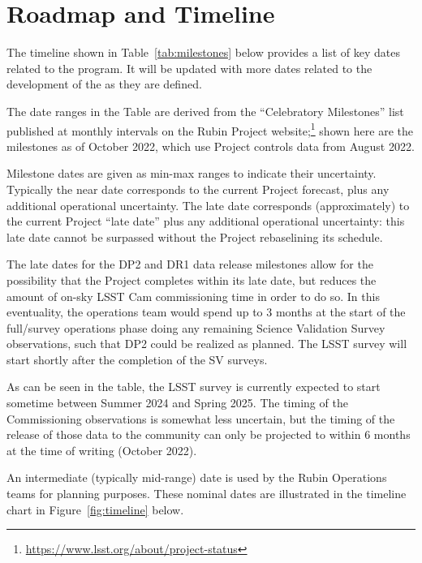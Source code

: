 \section{Roadmap and Timeline} \label{sec:timeline}

The timeline shown in Table~\ref{tab:milestones} below provides a list of key dates related to the \es program.
It will be updated with more dates related to the development of the \esp as they are defined.

The date ranges in the Table are derived from the ``Celebratory Milestones'' list published at monthly intervals on the Rubin Project website;\footnote{\url{https://www.lsst.org/about/project-status}} shown here are the milestones as of October 2022, which use Project controls data from August 2022.

Milestone dates are given as min-max ranges to indicate their uncertainty.
Typically the near date corresponds to the current Project forecast, plus any additional operational uncertainty.
The late date corresponds (approximately) to the current Project ``late date'' plus any additional operational uncertainty: this late date cannot be surpassed without the Project rebaselining its schedule.

The late dates for the DP2 and DR1 data release milestones allow for the possibility that the Project completes within its late date, but reduces the amount of on-sky LSST Cam commissioning time in order to do so.
In this eventuality, the operations team would spend up to 3 months at the start of the full/survey operations phase doing any remaining Science Validation Survey observations, such that DP2 could be realized as planned.
The LSST survey will start shortly after the completion of the SV surveys.

As can be seen in the table, the LSST survey is currently expected to start sometime between Summer 2024 and Spring 2025.
The timing of the Commissioning observations is somewhat less uncertain, but the timing of the release of those data to the community can only be projected to within 6 months at the time of writing (October 2022).

An intermediate (typically mid-range) date is used by the Rubin Operations teams for planning purposes. These nominal dates are illustrated in the timeline chart in Figure~\ref{fig:timeline} below.

